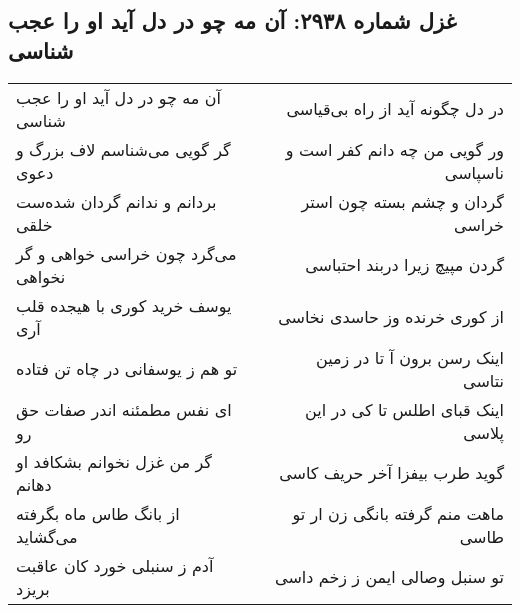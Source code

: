 \begin{center}
\section*{غزل شماره ۲۹۳۸: آن مه چو در دل آید او را عجب شناسی}
\label{sec:2938}
\begin{longtable}{l p{0.5cm} r}
آن مه چو در دل آید او را عجب شناسی
&&
در دل چگونه آید از راه بی‌قیاسی
\\
گر گویی می‌شناسم لاف بزرگ و دعوی
&&
ور گویی من چه دانم کفر است و ناسپاسی
\\
بردانم و ندانم گردان شده‌ست خلقی
&&
گردان و چشم بسته چون استر خراسی
\\
می‌گرد چون خراسی خواهی و گر نخواهی
&&
گردن مپیچ زیرا دربند احتباسی
\\
یوسف خرید کوری با هیجده قلب آری
&&
از کوری خرنده وز حاسدی نخاسی
\\
تو هم ز یوسفانی در چاه تن فتاده
&&
اینک رسن برون آ تا در زمین نتاسی
\\
ای نفس مطمئنه اندر صفات حق رو
&&
اینک قبای اطلس تا کی در این پلاسی
\\
گر من غزل نخوانم بشکافد او دهانم
&&
گوید طرب بیفزا آخر حریف کاسی
\\
از بانگ طاس ماه بگرفته می‌گشاید
&&
ماهت منم گرفته بانگی زن ار تو طاسی
\\
آدم ز سنبلی خورد کان عاقبت بریزد
&&
تو سنبل وصالی ایمن ز زخم داسی
\\
\end{longtable}
\end{center}
